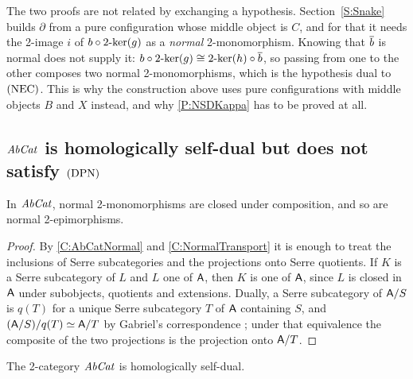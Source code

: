 \begin{remark}
  \label{Rem NSD NotSwap}
  The two proofs are not related by exchanging a hypothesis. Section~\ref{S:Snake} builds \(\partial\) from a pure configuration whose middle object is \(C\), and for that it needs the 2-image \(i\) of \(b\circ2\text{-}\mathrm{ker}(g)\) as a \emph{normal} 2-monomorphism. Knowing that \(\overline{b}\) is normal does not supply it: \(b\circ2\text{-}\mathrm{ker}(g)\cong2\text{-}\mathrm{ker}(h)\circ\overline{b}\), so passing from one to the other composes two normal 2-monomorphisms, which is the hypothesis dual to \(\textup{(NEC)}\). This is why the construction above uses pure configurations with middle objects \(B\) and \(X\) instead, and why \prox\ref{P:NSDKappa} has to be proved at all.
\end{remark}

\subsection{\texorpdfstring{\(\mathit{AbCat}\)}{AbCat} is homologically self-dual but does not satisfy \texorpdfstring{\(\textup{(DPN)}\)}{(DPN)}}\label{SS:NSDAbCat}

\begin{proposition}
  \label{P:AbCatComposition} 
  In \(\mathit{AbCat}\), normal 2-monomorphisms are closed under composition, and so are normal 2-epimorphisms.
\end{proposition}

\begin{proof}
  By \corx\ref{C:AbCatNormal} and \corx\ref{C:NormalTransport} it is enough to treat the inclusions of Serre subcategories and the projections onto Serre quotients. If \(K\) is a Serre subcategory of \(L\) and \(L\) one of \(\mathsf{A}\), then \(K\) is one of \(\mathsf{A}\), since \(L\) is closed in \(\mathsf{A}\) under subobjects, quotients and extensions. Dually, a Serre subcategory of \(\mathsf{A}/S\) is \(q(T)\) for a unique Serre subcategory \(T\) of \(\mathsf{A}\) containing \(S\), and \((\mathsf{A}/S)/q(T)\simeq\mathsf{A}/T\) by Gabriel's correspondence \cite[Chapter~III]{Gabriel62}; under that equivalence the composite of the two projections is the projection onto \(\mathsf{A}/T\).
\end{proof}

\begin{proposition}
  \label{P:AbCatHSD} 
  The 2-category \(\mathit{AbCat}\) is homologically self-dual.
\end{proposition}

